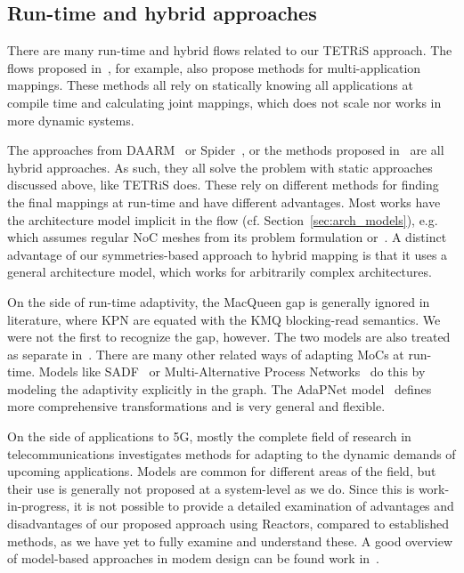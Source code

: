 \subsection{Run-time and hybrid approaches}
There are many run-time and hybrid flows related to our \ac{TETRiS} approach.
The flows proposed in~\cite{castrillon2010trace,kang2014static,zhu2016providing}, for example, also propose methods for multi-application mappings.
These methods all rely on statically knowing all applications at compile time and calculating joint mappings, which does not scale nor works in more dynamic systems.

The approaches from DAARM~\cite{weichslgartner2014daarm} or Spider~\cite{heulot2014spider},
or the methods proposed in~\cite{moreira2007online,quan2015hybrid} are all hybrid approaches. 
As such, they all solve the problem with static approaches discussed above, like \ac{TETRiS} does.
These rely on different methods for finding the final mappings at run-time and have different advantages.
Most works have the architecture model implicit in the flow (cf. Section~\ref{sec:arch_models}),  e.g.~\cite{weichslgartner2014daarm} which assumes regular \ac{NoC} meshes from its problem formulation or~\cite{moreira2007online}.
A distinct advantage of our symmetries-based approach to hybrid mapping is that it uses a general architecture model, which works for arbitrarily complex architectures.

On the side of run-time adaptivity, the MacQueen gap is generally ignored in literature, where \ac{KPN} are equated with the \ac{KMQ} blocking-read semantics. 
We were not the first to recognize the gap, however.
The two models are also treated as separate in~\cite{lee_matsikoudis_semantics}.
There are many other related ways of adapting \acp{MoC} at run-time.
Models like \ac{SADF}~\cite{theelen2006scenario} or Multi-Alternative Process Networks~\cite{bouraoui_parma21} do this by modeling the adaptivity explicitly in the graph.
The AdaPNet model~\cite{schor2014adapnet} defines more comprehensive transformations and is very general and flexible.

On the side of applications to 5G, mostly the complete field of research in telecommunications investigates methods for adapting to the dynamic demands of upcoming applications.
Models are common for different areas of the field, but their use is generally not proposed at a system-level as we do.
Since this is work-in-progress, it is not possible to provide a detailed examination of advantages and disadvantages of our proposed approach using Reactors, compared to established methods, as we have yet to fully examine and understand these.
A good overview of model-based approaches in modem design can be found work in~\cite{gatherer2020towards}.

